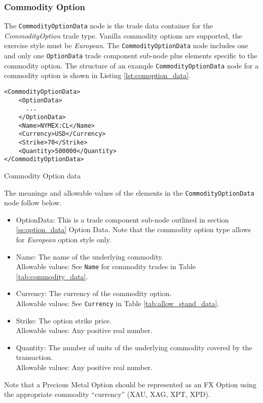 \subsubsection{Commodity Option}
\label{ss:input_commodity_option}

The \lstinline!CommodityOptionData!  node is the trade data container for the \emph{CommodityOption} trade type.  Vanilla commodity 
options are supported, the exercise style must be \emph{European}. The \lstinline!CommodityOptionData!  node includes one and 
only one \lstinline!OptionData! trade component sub-node plus elements specific to the commodity option. The structure of 
an example \lstinline!CommodityOptionData! node for a commodity option is shown in Listing
\ref{lst:comoption_data}.

\begin{listing}[H]
\begin{verbatim}
<CommodityOptionData>
    <OptionData>
      ...
    </OptionData>
    <Name>NYMEX:CL</Name>
    <Currency>USD</Currency>
    <Strike>70</Strike>
    <Quantity>500000</Quantity>
</CommodityOptionData>
\end{verbatim}
\caption{Commodity Option data}
\label{lst:comoption_data}
\end{listing}

The meanings and allowable values of the elements in the \lstinline!CommodityOptionData!  node follow below.

\begin{itemize}

\item OptionData: This is a trade component sub-node outlined in section \ref{ss:option_data} Option Data. Note that the commodity option type allows for \emph{European} option style only.
\item Name: The name of the underlying commodity. \\
Allowable values:  See \lstinline!Name! for commodity trades in Table \ref{tab:commodity_data}.
\item Currency: The currency of the commodity option. \\
Allowable values:  See \lstinline!Currency! in Table \ref{tab:allow_stand_data}.
\item Strike: The option strike price.\\
Allowable values:  Any positive real number.
\item Quantity: The number of units of the underlying commodity covered by the transaction. \\
Allowable values:  Any positive real number.
\end{itemize}

Note that a Precious Metal Option should be represented as an FX
Option using the appropriate commodity ``currency'' (XAU, XAG, XPT, XPD).
